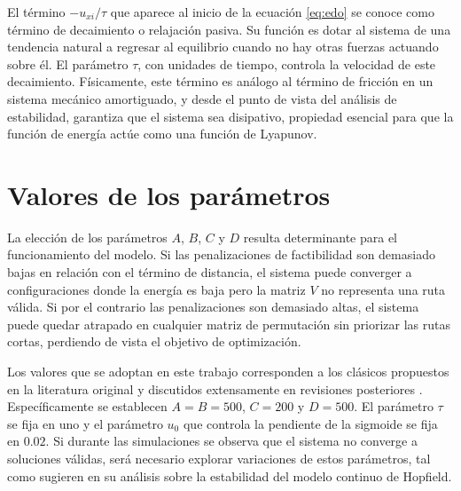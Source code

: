 \documentclass[12pt,a4paper]{article}
\begin{document}
\begin{metodologia}
El término $-u_{xi}/\tau$ que aparece al inicio de la ecuación \eqref{eq:edo} se conoce como término de decaimiento o relajación pasiva. Su función es dotar al sistema de una tendencia natural a regresar al equilibrio cuando no hay otras fuerzas actuando sobre él. El parámetro $\tau$, con unidades de tiempo, controla la velocidad de este decaimiento. Físicamente, este término es análogo al término de fricción en un sistema mecánico amortiguado, y desde el punto de vista del análisis de estabilidad, garantiza que el sistema sea disipativo, propiedad esencial para que la función de energía actúe como una función de Lyapunov.
\end{metodologia}

\section{Valores de los parámetros}

La elección de los parámetros $A$, $B$, $C$ y $D$ resulta determinante para el funcionamiento del modelo. Si las penalizaciones de factibilidad son demasiado bajas en relación con el término de distancia, el sistema puede converger a configuraciones donde la energía es baja pero la matriz $V$ no representa una ruta válida. Si por el contrario las penalizaciones son demasiado altas, el sistema puede quedar atrapado en cualquier matriz de permutación sin priorizar las rutas cortas, perdiendo de vista el objetivo de optimización.

Los valores que se adoptan en este trabajo corresponden a los clásicos propuestos en la literatura original \parencite{HopfieldTank1985} y discutidos extensamente en revisiones posteriores \parencite{TalavanYanez2002, Potvin2003}. Específicamente se establecen $A = B = 500$, $C = 200$ y $D = 500$. El parámetro $\tau$ se fija en uno y el parámetro $u_0$ que controla la pendiente de la sigmoide se fija en $0.02$. Si durante las simulaciones se observa que el sistema no converge a soluciones válidas, será necesario explorar variaciones de estos parámetros, tal como sugieren \textcite{ElAlaouiEttaouil2023} en su análisis sobre la estabilidad del modelo continuo de Hopfield.

\end{document}
